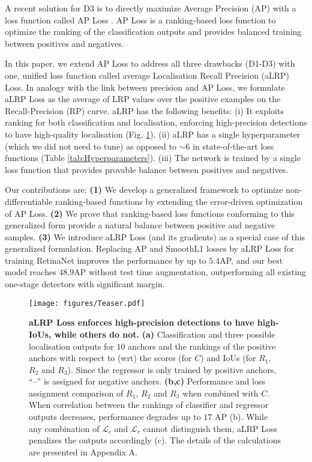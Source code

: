 \documentclass{article}
\begin{document}
A recent solution for D3 is to directly maximize Average Precision (AP) with a loss function called AP Loss \cite{APLoss}. AP Loss is a ranking-based loss function to optimize the ranking of the classification outputs and provides balanced training between positives and negatives.

In this paper, we extend AP Loss to address all three drawbacks (D1-D3) with one, unified loss function called average Localisation Recall Precision (aLRP) Loss. In analogy with the link between precision and AP Loss, we formulate aLRP Loss as the average of LRP values \cite{LRP} over the positive examples on the Recall-Precision (RP) curve. aLRP has the following benefits: (i) It exploits ranking for both classification and localisation, enforcing high-precision detections to have high-quality localisation (Fig. \ref{fig:Teaser}). (ii) aLRP has a single hyperparameter (which we did not need to tune) as opposed to $\sim$6 in state-of-the-art loss functions (Table \ref{tab:Hyperparameters}). (iii) The network is trained by a single loss function that provides provable balance between positives and negatives.

Our contributions are: 
\textbf{(1)} We develop a generalized framework to  optimize non-differentiable ranking-based functions by extending the error-driven optimization of AP Loss.
\textbf{(2)} We prove that ranking-based loss functions conforming to this generalized form provide a natural balance between positive and negative samples.
\textbf{(3)} We introduce aLRP Loss (and its gradients) as a special case of this generalized formulation. Replacing AP and SmoothL1 losses by aLRP Loss for training RetinaNet improves the performance by up to $5.4$AP, and our best model reaches $48.9$AP without test time augmentation, outperforming all existing one-stage detectors with significant margin.





\begin{figure}[t]
    \centerline{
        \texttt{[image: figures/Teaser.pdf]}
    }
    \caption{\textbf{aLRP Loss enforces high-precision detections to have high-IoUs, while others do not.} \textbf{(a)} Classification and three possible localisation outputs for $10$ anchors and the rankings of the positive anchors with respect to (wrt) the scores (for $C$) and IoUs (for $R_1$, $R_2$ and $R_3$). Since the regressor is only trained by positive anchors, ``--'' is assigned for negative anchors. \textbf{(b,c)} Performance and loss assignment comparison of $R_1$, $R_2$ and $R_3$ when combined with $C$. When correlation between the rankings of classifier and regressor outputs decreases, performance degrades up to $17$ AP (b). While any combination of $\mathcal{L}_c$ and $\mathcal{L}_r$ cannot distinguish  them, aLRP Loss penalizes the outputs accordingly (c). The details of the calculations are presented in Appendix A. 
} 
\label{fig:Teaser}
\end{figure}
\end{document}
